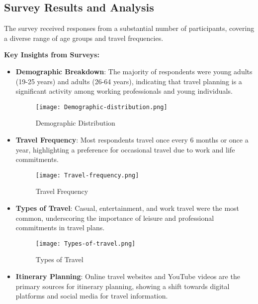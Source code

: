 \documentclass[conference]{IEEEtran}
\begin{document}
    \subsection{Survey Results and Analysis}
        The survey received responses from a substantial number of participants, covering a diverse range of age groups and travel frequencies.

        \textbf{Key Insights from Surveys:}

        \begin{itemize}
            \item \textbf{Demographic Breakdown}: The majority of respondents were young adults (19-25 years) and adults (26-64 years), indicating that travel planning is a significant activity among working professionals and young individuals.
            \begin{figure}
                \centering
                \texttt{[image: Demographic-distribution.png]}
                \caption{Demographic Distribution}
                \label{fig:demographic-distribution}
            \end{figure}
            \item \textbf{Travel Frequency}: Most respondents travel once every 6 months or once a year, highlighting a preference for occasional travel due to work and life commitments.
            \begin{figure}
                \centering
                \texttt{[image: Travel-frequency.png]}
                \caption{Travel Frequency}
                \label{fig:travel-frequency}
            \end{figure}
            \item \textbf{Types of Travel}: Casual, entertainment, and work travel were the most common, underscoring the importance of leisure and professional commitments in travel plans.
            \begin{figure}
                \centering
                \texttt{[image: Types-of-travel.png]}
                \caption{Types of Travel}
                \label{fig:types-of-travel}
            \end{figure}
            \item \textbf{Itinerary Planning}: Online travel websites and YouTube videos are the primary sources for itinerary planning, showing a shift towards digital platforms and social media for travel information.
            \begin{figure}

\end{figure}
\end{itemize}
\end{document}
